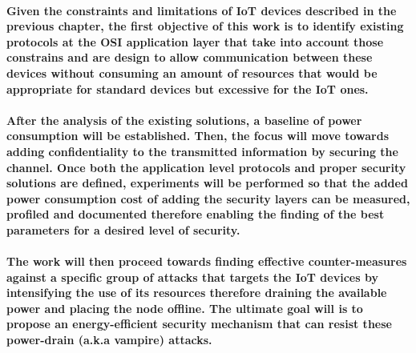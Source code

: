 \paragraph{
Given the constraints and limitations of \ac{IoT} devices described in the previous chapter, the first objective of this work is to identify existing protocols at the OSI application layer that take into account those constrains and are design to allow communication between these devices without consuming an amount of resources that would be appropriate for standard devices but excessive for the \ac{IoT} ones.
}

\paragraph{
After the analysis of the existing solutions, a baseline of power consumption will be established. Then, the focus will move towards adding confidentiality to the transmitted information by securing the channel.
Once both the application level protocols and proper security solutions are defined, experiments will be performed so that the added power consumption cost of adding the security layers can be measured, profiled and documented therefore enabling the finding of the best parameters for a desired level of security.
}

\paragraph{
The work will then proceed towards finding effective counter-measures against a specific group of attacks that targets the \ac{IoT} devices by intensifying the use of its resources therefore draining the available power and placing the node offline.
The ultimate goal will is to propose an energy-efficient security mechanism that can resist these power-drain (a.k.a vampire) attacks.
}